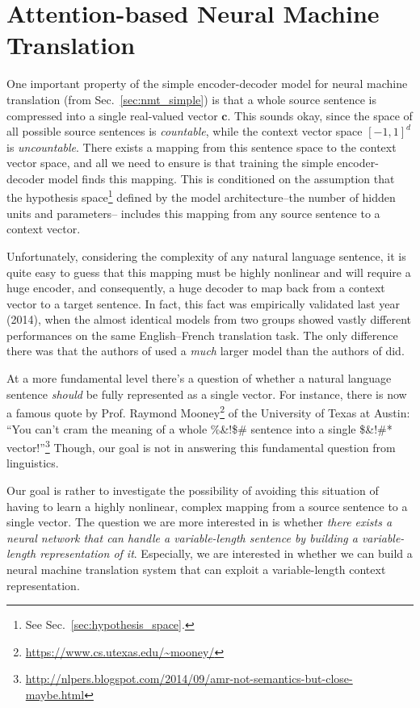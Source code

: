 \documentclass{report}
\newcommand{\vect}[1]{\mathbf{#1}}
\newcommand{\vc}[0]{\vect{c}}
\begin{document}
\section{Attention-based Neural Machine Translation}
\label{sec:att_mt}

One important property of the simple encoder-decoder model for neural machine
translation (from Sec.~\ref{sec:nmt_simple}) is that a whole source sentence is
compressed into a single real-valued vector $\vc$. This sounds okay, since the
space of all possible source sentences is {\em countable}, while the context
vector space $\left[ -1, 1 \right]^d$ is {\em uncountable}. There exists a
mapping from this sentence space to the context vector space, and all we need to
ensure is that training the simple encoder-decoder model finds this mapping.
This is conditioned on the assumption that the hypothesis space\footnote{
    See Sec.~\ref{sec:hypothesis_space}.
}
defined by the
model architecture--the number of hidden units and parameters-- includes this
mapping from any source sentence to a context vector.

Unfortunately, considering the complexity of any natural language sentence, it
is quite easy to guess that this mapping must be highly nonlinear and will require
a huge encoder, and consequently, a huge decoder to map back from a context
vector to a target sentence. In fact, this fact was empirically validated last
year (2014), when the almost identical models from two groups
\cite{sutskever2014sequence,cho2014properties} showed vastly different
performances on the same English--French translation task. The only difference
there was that the authors of \cite{sutskever2014sequence} used a {\em much}
larger model than the authors of \cite{cho2014properties} did.

At a more fundamental level there's a question of whether a natural language
sentence {\em should} be fully represented as a single vector. For instance,
there is now a famous quote by Prof. Raymond Mooney\footnote{
    \url{https://www.cs.utexas.edu/~mooney/}
} 
of the University of Texas at Austin: ``You can't cram the meaning of a whole
\%\&!\$\# sentence into a single \$\&!\#* vector!''\footnote{
    \url{http://nlpers.blogspot.com/2014/09/amr-not-semantics-but-close-maybe.html}
} Though, our goal is not in answering this fundamental question from
linguistics.

Our goal is rather to investigate the possibility of avoiding this situation of
having to learn a highly nonlinear, complex mapping from a source sentence to a
single vector. The question we are more interested in is whether {\em there
    exists a neural network that can handle a variable-length sentence by
building a variable-length representation of it}. Especially, we are interested
in whether we can build a neural machine translation system that can exploit a
variable-length context representation.
\end{document}
